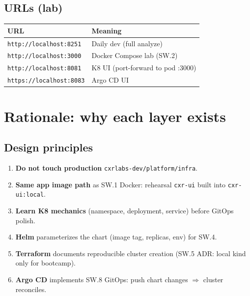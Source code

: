 \documentclass[11pt,a4paper]{report}
\begin{document}
\section{URLs (lab)}
\begin{center}
\begin{tabular}{ll}
\toprule
URL & Meaning \\
\midrule
\texttt{http://localhost:8251} & Daily dev (full analyze) \\
\texttt{http://localhost:3000} & Docker Compose lab (SW.2) \\
\texttt{http://localhost:8081} & K8 UI (port-forward to pod :3000) \\
\texttt{https://localhost:8083} & Argo CD UI \\
\bottomrule
\end{tabular}
\end{center}

\chapter{Rationale: why each layer exists}

\section{Design principles}
\begin{enumerate}
  \item \textbf{Do not touch production} \texttt{cxrlabs-dev/platform/infra}.
  \item \textbf{Same app image path} as SW.1 Docker: rehearsal \texttt{cxr-ui} built into \texttt{cxr-ui:local}.
  \item \textbf{Learn K8 mechanics} (namespace, deployment, service) before GitOps polish.
  \item \textbf{Helm} parameterizes the chart (image tag, replicas, env) for SW.4.
  \item \textbf{Terraform} documents reproducible cluster creation (SW.5 ADR: local kind only for bootcamp).
  \item \textbf{Argo CD} implements SW.8 GitOps: push chart changes $\Rightarrow$ cluster reconciles.
\end{enumerate}
\end{document}

